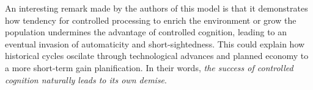 \documentclass[10pt,a4paper]{article}
\begin{document}
An interesting remark made by the authors of this model is that it demonstrates how tendency for controlled processing to enrich the environment or grow the population
undermines the advantage of controlled cognition, leading to an eventual invasion of automaticity and short-sightedness. This could explain how historical cycles
oscilate through technological advances and planned economy to a more short-term gain planification. In their words, \emph{the success of controlled cognition naturally leads 
to its own demise}.




\end{document}
